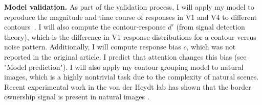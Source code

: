 \documentclass[11pt,notitlepage]{article}
\begin{document}
\textbf{Model validation.}  
As part of the validation process, I will apply my model to reproduce
the magnitude and 
time course of responses in V1 and V4 to different
contours~\citep{Chen_etal14}. I will also compute the contour-response
$d'$ (from signal detection theory), which is the difference in V1
response distributions for a contour versus noise
pattern. %
Additionally, I will compute response bias $c$, which was not reported
in the original \citep{Chen_etal14} article. I predict that attention
changes this bias 
(see "Model prediction").
I will also apply my contour grouping model to natural images, which
is a 
%
highly nontrivial task due to the complexity of natural scenes. Recent
experimental work in the von der Heydt lab has shown that the border
ownership signal is present in natural images
\citep{Williford_vonderHeydt14}.
\end{document}
